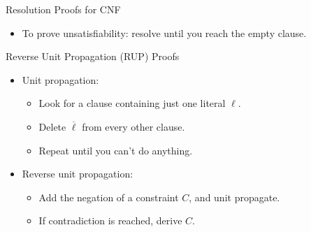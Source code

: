 \documentclass[aspectratio=169,compress,10pt]{beamer}
\begin{document}
\begin{frame}{Resolution Proofs for CNF}
{    \begin{itemize}
        \item To prove unsatisfiability: resolve until you reach the empty clause.
    \end{itemize}
}
\end{frame}

\begin{frame}{Reverse Unit Propagation (RUP) Proofs}
    \begin{itemize}
        \item Unit propagation:
            \begin{itemize}
                \item Look for a clause containing just one literal $\ell$.
                \item Delete $\overline{\ell}$ from every other clause.
                \item Repeat until you can't do anything.
            \end{itemize}
        \item Reverse unit propagation:
            \begin{itemize}
                \item Add the negation of a constraint $C$, and unit propagate.
                \item If contradiction is reached, derive $C$.
            \end{itemize}
    \end{itemize}
\end{frame}
\end{document}
